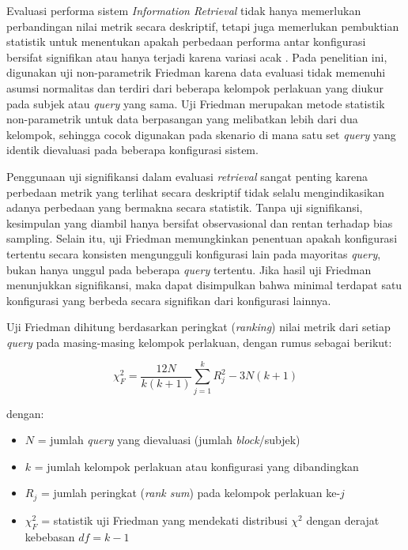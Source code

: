 Evaluasi performa sistem \textit{Information Retrieval} tidak hanya memerlukan perbandingan nilai metrik secara deskriptif, tetapi juga memerlukan pembuktian statistik untuk menentukan apakah perbedaan performa antar konfigurasi bersifat signifikan atau hanya terjadi karena variasi acak \cite{pereira2015overview}. Pada penelitian ini, digunakan uji non-parametrik Friedman karena data evaluasi tidak memenuhi asumsi normalitas dan terdiri dari beberapa kelompok perlakuan yang diukur pada subjek atau \textit{query} yang sama. Uji Friedman merupakan metode statistik non-parametrik untuk data berpasangan yang melibatkan lebih dari dua kelompok, sehingga cocok digunakan pada skenario di mana satu set \textit{query} yang identik dievaluasi pada beberapa konfigurasi sistem.

Penggunaan uji signifikansi dalam evaluasi \textit{retrieval} sangat penting karena perbedaan metrik yang terlihat secara deskriptif tidak selalu mengindikasikan adanya perbedaan yang bermakna secara statistik. Tanpa uji signifikansi, kesimpulan yang diambil hanya bersifat observasional dan rentan terhadap bias sampling. Selain itu, uji Friedman memungkinkan penentuan apakah konfigurasi tertentu secara konsisten mengungguli konfigurasi lain pada mayoritas \textit{query}, bukan hanya unggul pada beberapa \textit{query} tertentu. Jika hasil uji Friedman menunjukkan signifikansi, maka dapat disimpulkan bahwa minimal terdapat satu konfigurasi yang berbeda secara signifikan dari konfigurasi lainnya.

Uji Friedman dihitung berdasarkan peringkat (\textit{ranking}) nilai metrik dari setiap \textit{query} pada masing-masing kelompok perlakuan, dengan rumus sebagai berikut:

\begin{equation}
	\chi_F^2 = \frac{12N}{k(k+1)} \sum_{j=1}^{k} R_j^2 - 3N(k+1)
\end{equation}

dengan:
\begin{itemize}
	\item $N$ = jumlah \textit{query} yang dievaluasi (jumlah \textit{block}/subjek)
	\item $k$ = jumlah kelompok perlakuan atau konfigurasi yang dibandingkan
	\item $R_j$ = jumlah peringkat (\textit{rank sum}) pada kelompok perlakuan ke-$j$
	\item $\chi_F^2$ = statistik uji Friedman yang mendekati distribusi $\chi^2$ dengan derajat kebebasan $df = k - 1$
\end{itemize}

